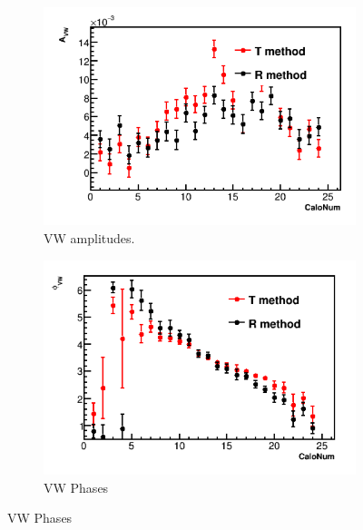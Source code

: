 \documentclass[12pt,letterpaper]{article}
\begin{document}
\begin{figure}[]
\centering
    \begin{subfigure}[t]{0.45\textwidth}
        \centering
        \includegraphics[width=\textwidth]{9d_noTimeRand_Avw_Compared}
        \caption{VW amplitudes.}
    \end{subfigure}%
    \hspace{5mm}
    \begin{subfigure}[t]{0.45\textwidth}
        \centering
        \includegraphics[width=\textwidth]{9d_noTimeRand_Phivw_Compared}
        \caption{VW Phases}
    \end{subfigure}


\end{figure}
\end{document}
